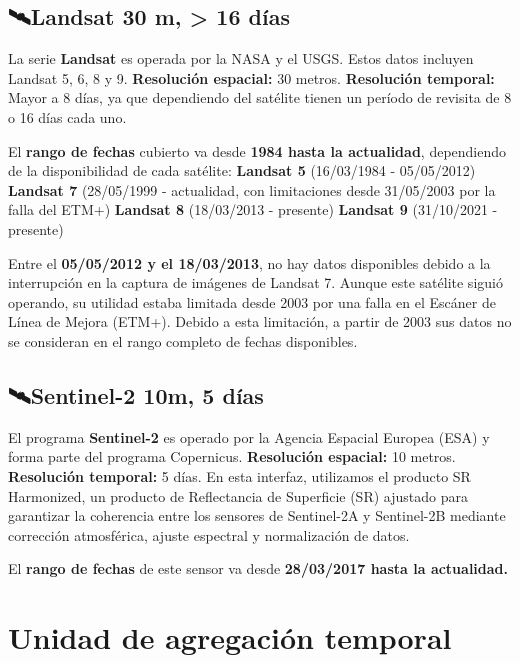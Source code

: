 \documentclass[
]{book}
\begin{document}
\section{\texorpdfstring{\textbf{🛰️Landsat 30 m, \textgreater{} 16 días}}{🛰️Landsat 30 m, \textgreater{} 16 días}}\label{landsat-30-m-16-duxedas}

La serie \textbf{Landsat} es operada por la NASA y el USGS. Estos datos incluyen Landsat 5, 6, 8 y 9. \textbf{Resolución espacial:} 30 metros. \textbf{Resolución temporal:} Mayor a 8 días, ya que dependiendo del satélite tienen un período de revisita de 8 o 16 días cada uno.

El \textbf{rango de fechas} cubierto va desde \textbf{1984 hasta la actualidad}, dependiendo de la disponibilidad de cada satélite:
\textbf{Landsat 5} (16/03/1984 - 05/05/2012)
\textbf{Landsat 7} (28/05/1999 - actualidad, con limitaciones desde 31/05/2003 por la falla del ETM+)
\textbf{Landsat 8} (18/03/2013 - presente)
\textbf{Landsat 9} (31/10/2021 - presente)

Entre el \textbf{05/05/2012 y el 18/03/2013}, no hay datos disponibles debido a la interrupción en la captura de imágenes de Landsat 7. Aunque este satélite siguió operando, su utilidad estaba limitada desde 2003 por una falla en el Escáner de Línea de Mejora (ETM+). Debido a esta limitación, a partir de 2003 sus datos no se consideran en el rango completo de fechas disponibles.

\section{\texorpdfstring{\textbf{🛰️Sentinel-2 10m, 5 días}}{🛰️Sentinel-2 10m, 5 días}}\label{sentinel-2-10m-5-duxedas}

El programa \textbf{Sentinel-2} es operado por la Agencia Espacial Europea (ESA) y forma parte del programa Copernicus. \textbf{Resolución espacial:} 10 metros. \textbf{Resolución temporal:} 5 días. En esta interfaz, utilizamos el producto SR Harmonized, un producto de Reflectancia de Superficie (SR) ajustado para garantizar la coherencia entre los sensores de Sentinel-2A y Sentinel-2B mediante corrección atmosférica, ajuste espectral y normalización de datos.

El \textbf{rango de fechas} de este sensor va desde \textbf{28/03/2017 hasta la actualidad.}

\chapter{Unidad de agregación temporal}\label{ud-agregacion-temporal}
\end{document}

